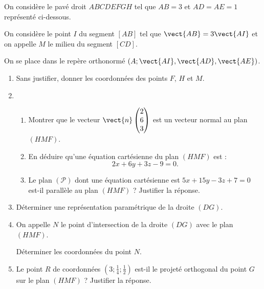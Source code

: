 On considère le pavé droit $ABCDEFGH$ tel que $AB = 3$ et $AD = AE =1$ représenté ci-dessous.

\begin{Centrage}
	\begin{EnvTikzEspace}[UniteX={0:2.75cm},UniteY={65:1.75cm},UniteZ={90:4cm}]
	\end{EnvTikzEspace}
\end{Centrage}

On considère le point $I$ du segment $[AB]$ tel que $\vect{AB}=3\vect{AI}$ et on appelle $M$ le milieu du segment $[CD]$.

\smallskip

On se place dans le repère orthonormé $\left(A;\vect{AI},\vect{AD},\vect{AE}\right)$.

\begin{enumerate}
	\item Sans justifier, donner les coordonnées des points $F$, $H$ et $M$.
	\item 
	\begin{enumerate}
		\item Montrer que le vecteur $\vect{n} \begin{pmatrix}2\\6\\3\end{pmatrix}$ est un vecteur normal au plan $(HMF)$.
		\item En déduire qu'une équation cartésienne du plan $(HMF)$ est : \[ 2x + 6y + 3z - 9 = 0. \]
		\item Le plan $(\mathcal{P})$ dont une équation cartésienne est $5x + 15y - 3z + 7 = 0$ est-il parallèle au plan $(HMF)$ ? Justifier la réponse.
	\end{enumerate}
	\item Déterminer une représentation paramétrique de la droite $(DG)$.
	\item On appelle $N$ le point d'intersection de la droite $(DG)$ avec le plan $(HMF)$.
	
	Déterminer les coordonnées du point $N$.
	\item Le point $R$ de coordonnées $\left(3;\frac14;\frac12\right)$ est-il le projeté orthogonal du point $G$ sur le plan $(HMF)$ ? Justifier la réponse.
\end{enumerate}